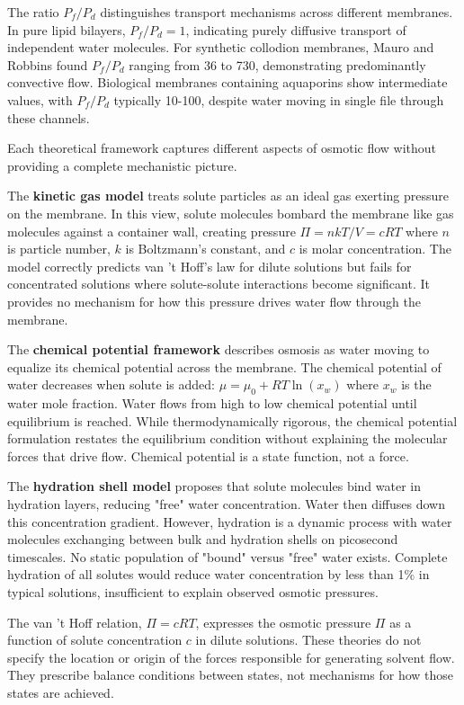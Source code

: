 The ratio $P_f/P_d$ distinguishes transport mechanisms across different membranes. In pure lipid bilayers, $P_f/P_d = 1$, indicating purely diffusive transport of independent water molecules. For synthetic collodion membranes, Mauro and Robbins found $P_f/P_d$ ranging from 36 to 730, demonstrating predominantly convective flow. Biological membranes containing aquaporins show intermediate values, with $P_f/P_d$ typically 10-100, despite water moving in single file through these channels.

Each theoretical framework captures different aspects of osmotic flow without providing a complete mechanistic picture.

The \textbf{kinetic gas model} treats solute particles as an ideal gas exerting pressure on the membrane. In this view, solute molecules bombard the membrane like gas molecules against a container wall, creating pressure $\Pi = nkT/V = cRT$ where $n$ is particle number, $k$ is Boltzmann's constant, and $c$ is molar concentration. The model correctly predicts van 't Hoff's law for dilute solutions but fails for concentrated solutions where solute-solute interactions become significant. It provides no mechanism for how this pressure drives water flow through the membrane.

The \textbf{chemical potential framework} describes osmosis as water moving to equalize its chemical potential across the membrane. The chemical potential of water decreases when solute is added: $\mu = \mu_0 + RT \ln(x_w)$ where $x_w$ is the water mole fraction. Water flows from high to low chemical potential until equilibrium is reached. While thermodynamically rigorous, the chemical potential formulation restates the equilibrium condition without explaining the molecular forces that drive flow. Chemical potential is a state function, not a force.

The \textbf{hydration shell model} proposes that solute molecules bind water in hydration layers, reducing "free" water concentration. Water then diffuses down this concentration gradient. However, hydration is a dynamic process with water molecules exchanging between bulk and hydration shells on picosecond timescales. No static population of "bound" versus "free" water exists. Complete hydration of all solutes would reduce water concentration by less than 1\% in typical solutions, insufficient to explain observed osmotic pressures.

The van 't Hoff relation, $\Pi = cRT$, expresses the osmotic pressure $\Pi$ as a function of solute concentration $c$ in dilute solutions. These theories do not specify the location or origin of the forces responsible for generating solvent flow. They prescribe balance conditions between states, not mechanisms for how those states are achieved.

